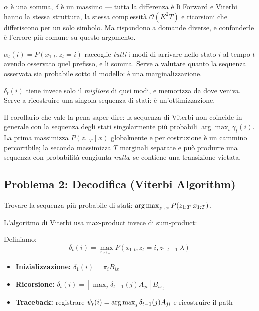 \begin{intuizione}{$\alpha$ è una somma, $\delta$ è un massimo — tutta la differenza è lì}
Forward e Viterbi hanno la stessa struttura, la stessa complessità $\mathcal{O}(K^2T)$ e ricorsioni che differiscono per un solo simbolo. Ma rispondono a domande diverse, e confonderle è l'errore più comune su questo argomento.

$\alpha_t(i) = P(x_{1:t}, z_t = i)$ raccoglie \emph{tutti} i modi di arrivare nello stato $i$ al tempo $t$ avendo osservato quel prefisso, e li somma. Serve a valutare quanto la sequenza osservata sia probabile sotto il modello: è una marginalizzazione.

$\delta_t(i)$ tiene invece solo il \emph{migliore} di quei modi, e memorizza da dove veniva. Serve a ricostruire una singola sequenza di stati: è un'ottimizzazione.

Il corollario che vale la pena saper dire: la sequenza di Viterbi non coincide in generale con la sequenza degli stati singolarmente più probabili $\arg\max_i \gamma_t(i)$. La prima massimizza $P(z_{1:T} \mid x)$ globalmente e per costruzione è un cammino percorribile; la seconda massimizza $T$ marginali separate e può produrre una sequenza con probabilità congiunta \emph{nulla}, se contiene una transizione vietata.
\end{intuizione}

\subsection{Problema 2: Decodifica (Viterbi Algorithm)}

Trovare la sequenza più probabile di stati: $\operatorname*{arg\,max}_{z_{1:T}} P(z_{1:T}|x_{1:T})$.

L'algoritmo di Viterbi usa max-product invece di sum-product:

\begin{definition}
  Definiamo:
  \[\delta_t(i) = \max_{z_{1:t-1}} P(x_{1:t}, z_t = i, z_{1:t-1} | \lambda)\]
\end{definition}

\begin{theorem}
  \begin{itemize}
    \item \textbf{Inizializzazione:} $\delta_1(i) = \pi_i B_{ix_1}$
    \item \textbf{Ricorsione:} $\delta_t(i) = \left[\max_j \delta_{t-1}(j) A_{ji}\right] B_{ix_t}$
    \item \textbf{Traceback:} registrare $\psi_t(i) = \operatorname*{arg\,max}_j \delta_{t-1}(j) A_{ji}$ e ricostruire il path
  \end{itemize}
\end{theorem}

